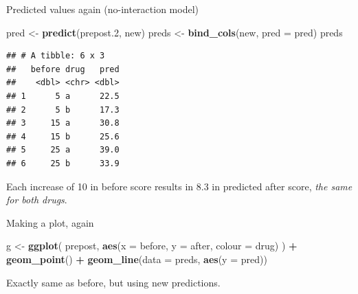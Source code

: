 \documentclass[ignorenonframetext,]{beamer}
\newenvironment{Shaded}{\begin{snugshade}}{\end{snugshade}}
\newcommand{\DataTypeTok}[1]{\textcolor[rgb]{0.13,0.29,0.53}{#1}}
\newcommand{\FloatTok}[1]{\textcolor[rgb]{0.00,0.00,0.81}{#1}}
\newcommand{\KeywordTok}[1]{\textcolor[rgb]{0.13,0.29,0.53}{\textbf{#1}}}
\newcommand{\NormalTok}[1]{#1}
\newcommand{\OperatorTok}[1]{\textcolor[rgb]{0.81,0.36,0.00}{\textbf{#1}}}
\newcommand{\StringTok}[1]{\textcolor[rgb]{0.31,0.60,0.02}{#1}}
\begin{document}
\begin{frame}[fragile]{Predicted values again (no-interaction model)}
\protect\hypertarget{predicted-values-again-no-interaction-model}{}

\begin{Shaded}
\begin{Highlighting}[]
\NormalTok{pred <-}\StringTok{ }\KeywordTok{predict}\NormalTok{(prepost}\FloatTok{.2}\NormalTok{, new)}
\NormalTok{preds <-}\StringTok{ }\KeywordTok{bind_cols}\NormalTok{(new, }\DataTypeTok{pred =}\NormalTok{ pred)}
\NormalTok{preds}
\end{Highlighting}
\end{Shaded}

\begin{verbatim}
## # A tibble: 6 x 3
##   before drug   pred
##    <dbl> <chr> <dbl>
## 1      5 a      22.5
## 2      5 b      17.3
## 3     15 a      30.8
## 4     15 b      25.6
## 5     25 a      39.0
## 6     25 b      33.9
\end{verbatim}

Each increase of 10 in before score results in 8.3 in predicted after
score, \emph{the same for both drugs}.

\end{frame}

\begin{frame}[fragile]{Making a plot, again}
\protect\hypertarget{making-a-plot-again}{}

\begin{Shaded}
\begin{Highlighting}[]
\NormalTok{g <-}\StringTok{ }\KeywordTok{ggplot}\NormalTok{(}
\NormalTok{  prepost,}
  \KeywordTok{aes}\NormalTok{(}\DataTypeTok{x =}\NormalTok{ before, }\DataTypeTok{y =}\NormalTok{ after, }\DataTypeTok{colour =}\NormalTok{ drug)}
\NormalTok{) }\OperatorTok{+}
\StringTok{  }\KeywordTok{geom_point}\NormalTok{() }\OperatorTok{+}
\StringTok{  }\KeywordTok{geom_line}\NormalTok{(}\DataTypeTok{data =}\NormalTok{ preds, }\KeywordTok{aes}\NormalTok{(}\DataTypeTok{y =}\NormalTok{ pred))}
\end{Highlighting}
\end{Shaded}

Exactly same as before, but using new predictions.

\end{frame}
\end{document}
